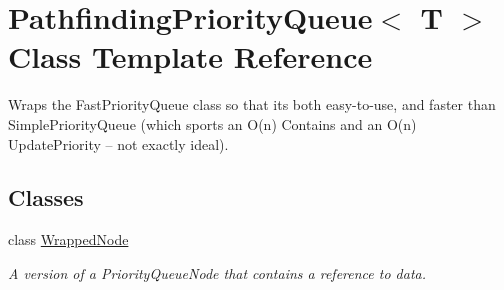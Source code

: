 \hypertarget{class_pathfinding_priority_queue}{}\section{Pathfinding\+Priority\+Queue$<$ T $>$ Class Template Reference}
\label{class_pathfinding_priority_queue}


Wraps the Fast\+Priority\+Queue class so that it\textquotesingle{}s both easy-\/to-\/use, and faster than Simple\+Priority\+Queue (which sports an O(n) Contains and an O(n) Update\+Priority -- not exactly ideal).  


\subsection*{Classes}
\begin{DoxyCompactItemize}
\item 
class \hyperlink{class_pathfinding_priority_queue_1_1_wrapped_node}{Wrapped\+Node}
\begin{DoxyCompactList}\small\item\em A version of a Priority\+Queue\+Node that contains a reference to data. \end{DoxyCompactList}\end{DoxyCompactItemize}
